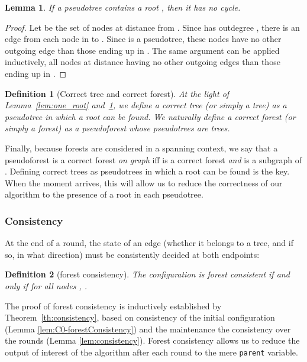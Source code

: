 \documentclass[twocolumn]{article}
\newtheorem{definition}{Definition}
\newtheorem{lemma}{Lemma}
\begin{document}
\begin{lemma}
\label{lem:pseudotree_tree}
If a pseudotree  contains a root , then it has no cycle.
\end{lemma}

\begin{proof} Let  be the set of nodes at distance  from . Since  has outdegree , there is an edge from each node in  to . Since  is a pseudotree, these nodes have no other outgoing edge than those ending up in . The same argument can be applied inductively, all nodes at distance  having no other outgoing edges than those ending up in .
 \end{proof}

\begin{definition}[Correct tree and correct forest]
\label{def:forest}
At the light of Lemma~\ref{lem:one_root} and~\ref{lem:pseudotree_tree}, we define a {\em correct tree} (or simply a {\em tree}) as a pseudotree in which a root can be found. We naturally define a {\em correct forest} (or simply a {\em forest}) as a pseudoforest whose pseudotrees are trees.

\end{definition}

Finally, because forests are considered in a spanning context, we say that a pseudoforest  is a correct forest {\em on graph}  iff  is a correct forest {\em and}  is a subgraph of . Defining correct trees as pseudotrees in which a root can be found is the key. When the moment arrives, this will allow us to reduce the correctness of our algorithm to the presence of a root in each pseudotree.




\subsubsection{Consistency}

At the end of a round, the state of an edge (whether it belongs to a tree, and if so, in what direction) must be consistently decided at both endpoints:

\begin{definition}[forest consistency]
The configuration 
is forest consistent if and only if for all nodes ,
.
\end{definition}

The proof of forest consistency is inductively established by Theorem~\ref{th:consistency}, based on consistency of the initial configuration (Lemma \ref{lem:C0-forestConsistency}) and the maintenance the consistency over the rounds (Lemma \ref{lem:consistency}).
Forest consistency allows us to reduce the output of interest of the algorithm after each round  to the mere \texttt{parent} variable. 
\end{document}

